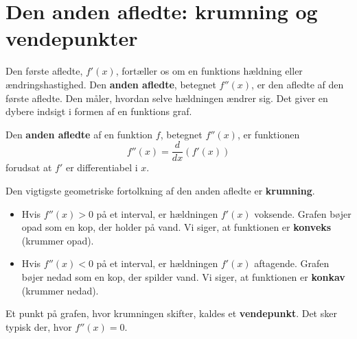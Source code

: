     \section{Den anden afledte: krumning og vendepunkter}

    Den første afledte, \(f'(x)\), fortæller os om en funktions hældning eller ændringshastighed. Den \textbf{anden afledte}, betegnet \(f''(x)\), er den afledte af den første afledte. Den måler, hvordan selve hældningen ændrer sig. Det giver en dybere indsigt i formen af en funktions graf.
    
    \begin{definition}
    Den \textbf{anden afledte} af en funktion \( f \), betegnet \( f''(x) \), er funktionen
    \[
    f''(x) = \frac{d}{dx} \left( f'(x) \right)
    \]
    forudsat at $f'$ er differentiabel i $x$.
    \end{definition}
    
    Den vigtigste geometriske fortolkning af den anden afledte er \textbf{krumning}.
    
    \begin{itemize}
        \item Hvis \( f''(x) > 0 \) på et interval, er hældningen \(f'(x)\) voksende. Grafen bøjer opad som en kop, der holder på vand. Vi siger, at funktionen er \textbf{konveks} (krummer opad).
        \item Hvis \( f''(x) < 0 \) på et interval, er hældningen \(f'(x)\) aftagende. Grafen bøjer nedad som en kop, der spilder vand. Vi siger, at funktionen er \textbf{konkav} (krummer nedad).
    \end{itemize}
    
    Et punkt på grafen, hvor krumningen skifter, kaldes et \textbf{vendepunkt}. Det sker typisk der, hvor \(f''(x) = 0\).
    
